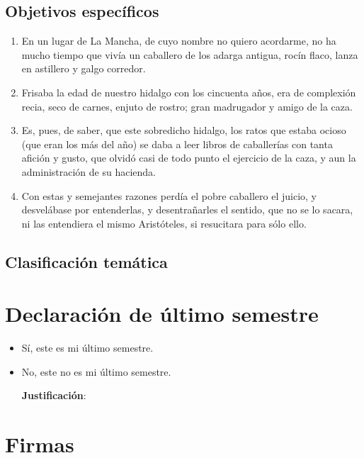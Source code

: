 \documentclass{avance-preliminar}
\begin{document}
\subsection*{Objetivos específicos}
\ifvacio
	\vspace{4cm}
\else
\begin{enumerate}
\item En un lugar de La Mancha, de cuyo nombre no quiero acordarme, no ha mucho tiempo que vivía un caballero de los adarga antigua, rocín flaco, lanza en astillero y galgo corredor.
\item Frisaba la edad de nuestro hidalgo con los cincuenta años, era de complexión recia, seco de carnes, enjuto de rostro; gran madrugador y amigo de la caza.
\item Es, pues, de saber, que este sobredicho hidalgo, los ratos que estaba ocioso (que eran los más del año) se daba a leer libros de caballerías con tanta afición y gusto, que olvidó casi de todo punto el ejercicio de la caza, y aun la administración de su hacienda.
\item Con estas y semejantes razones perdía el pobre caballero el juicio, y desvelábase por entenderlas, y desentrañarles el sentido, que no se lo sacara, ni las entendiera el mismo Aristóteles, si resucitara para sólo ello.
\end{enumerate}
\fi


\subsection*{Clasificación temática}
\ifvacio
	\vspace{1cm}
\else
   
\fi

\section*{Declaración de último semestre}

\begin{itemize}
\item[\seleccionar{}] Sí, este es mi último semestre.
\item[\seleccionar{}] No, este no es mi último semestre.

\textbf{Justificación}: 
\ifvacio
	\vspace{2cm}
\else
\lipsum[2]
\fi
\end{itemize}

\section*{Firmas}

\firmas

\newpage



\end{document}
